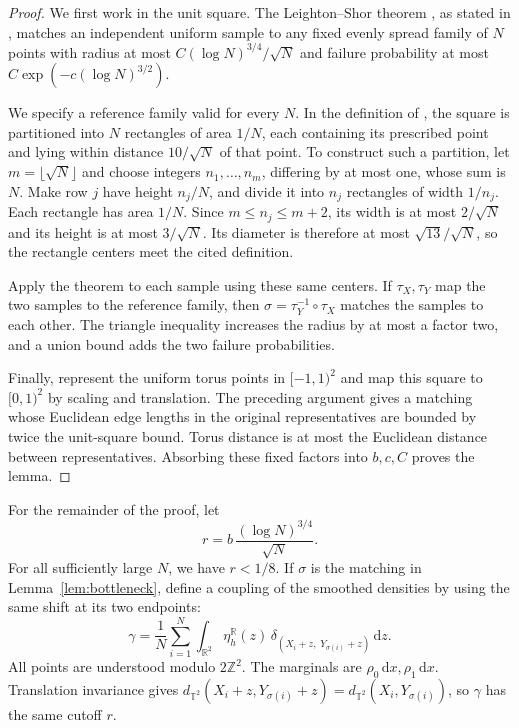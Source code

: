 \documentclass[11pt]{article}
\newcommand{\R}{\mathbb R}
\newcommand{\Z}{\mathbb Z}
\newcommand{\T}{\mathbb T^2}
\theoremstyle{remark}
\numberwithin{equation}{section}
\begin{document}
\begin{proof}
We first work in the unit square. The Leighton--Shor theorem
\cite{LS89}, as stated in \cite[Theorem~4.7.1]{Tal21}, matches an
independent uniform sample to any fixed evenly spread family of \(N\)
points with radius at most \(C(\log N)^{3/4}/\sqrt N\) and failure
probability at most \(C\exp(-c(\log N)^{3/2})\).

We specify a reference family valid for every \(N\). In the definition
of \cite[\S4.3]{Tal21}, the square is partitioned into \(N\) rectangles
of area \(1/N\), each containing its prescribed point and lying within
distance \(10/\sqrt N\) of that point. To construct such a partition,
let \(m=\lfloor\sqrt N\rfloor\) and choose integers
\(n_1,\ldots,n_m\), differing by at most one, whose sum is \(N\).
Make row \(j\) have height \(n_j/N\), and divide it into \(n_j\)
rectangles of width \(1/n_j\). Each rectangle has area \(1/N\).
Since \(m\le n_j\le m+2\), its width is at most \(2/\sqrt N\)
and its height is at most \(3/\sqrt N\). Its diameter is therefore
at most \(\sqrt{13}/\sqrt N\), so the rectangle centers meet the
cited definition.

Apply the theorem to each sample using these same centers. If
\(\tau_X,\tau_Y\) map the two samples to the reference family, then
\(\sigma=\tau_Y^{-1}\circ\tau_X\) matches the samples to each other.
The triangle inequality increases the radius by at most a factor two,
and a union bound adds the two failure probabilities.

Finally, represent the uniform torus points in \([-1,1)^2\) and map
this square to \([0,1)^2\) by scaling and translation. The preceding
argument gives a matching whose Euclidean edge lengths in the original
representatives are bounded by twice the unit-square bound. Torus
distance is at most the Euclidean distance between representatives.
Absorbing these fixed factors into \(b,c,C\) proves the lemma.
\end{proof}

For the remainder of the proof, let
\[
 r=b\,\frac{(\log N)^{3/4}}{\sqrt N}.
\]
For all sufficiently large \(N\), we have \(r<1/8\).
If \(\sigma\) is the matching in Lemma~\ref{lem:bottleneck},
define a coupling of the smoothed densities by using the same
shift at its two endpoints:
\begin{equation}
\label{eq:common-shift}
 \gamma=\frac1N\sum_{i=1}^N
 \int_{\R^2}\eta_h^{\R}(z)\,
 \delta_{(X_i+z,\;Y_{\sigma(i)}+z)}\,\mathrm dz.
\end{equation}
All points are understood modulo \(2\Z^2\).
The marginals are \(\rho_0\,\mathrm dx,\rho_1\,\mathrm dx\).
Translation invariance gives
\(d_{\T}(X_i+z,Y_{\sigma(i)}+z)=d_{\T}(X_i,Y_{\sigma(i)})\),
so \(\gamma\) has the same cutoff \(r\).
\end{document}
